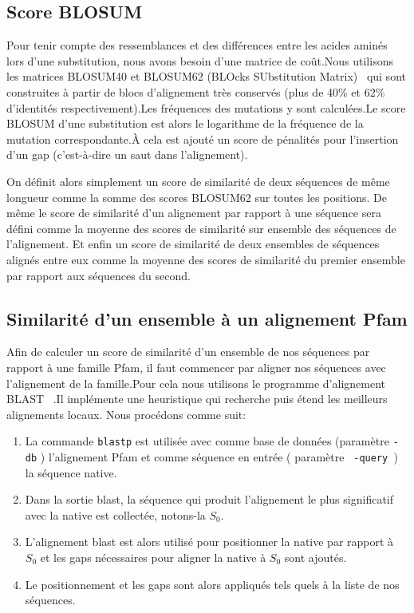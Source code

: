 \begin{enumerate}
\subsection{Score BLOSUM}

Pour tenir compte des ressemblances et des différences entre les acides aminés lors d'une substitution, nous avons besoin d'une matrice de coût.Nous utilisons les matrices BLOSUM40 et BLOSUM62 (BLOcks SUbstitution Matrix)~\citep{refBLOSUM} qui sont construites à partir de blocs d'alignement très conservés (plus de 40\% et 62\% d'identités respectivement).Les fréquences des mutations y sont calculées.Le score BLOSUM d'une substitution est alors le logarithme de la fréquence de la mutation correspondante.À cela est ajouté un score de pénalités pour l'insertion d'un gap (c'est-à-dire un saut dans l'alignement).

On définit alors simplement un score de similarité de deux séquences de même longueur comme la somme des scores BLOSUM62 sur toutes les positions. De même le score de similarité d'un alignement par rapport à une séquence sera défini comme la moyenne des scores de similarité sur ensemble des séquences de l'alignement. Et enfin un score de similarité de deux ensembles de séquences alignés entre eux comme la moyenne des scores de similarité du premier ensemble par rapport aux séquences du second.  

\subsection{Similarité d'un ensemble à un alignement Pfam}
\label{SimPfam}
Afin de calculer un score de similarité d'un ensemble de nos séquences par rapport à une famille Pfam, il faut commencer par aligner nos séquences avec l'alignement de la famille.Pour cela nous utilisons le programme d'alignement BLAST ~\citep{refBLAST}.Il implémente une heuristique qui recherche puis étend les meilleurs alignements locaux. Nous procédons comme suit:
\begin{enumerate}
\item La commande \verb!blastp! est utilisée avec comme base de données (paramètre \verb!-db! ) l'alignement Pfam et comme séquence en entrée ( paramètre \verb! -query !) la séquence native. 
\item Dans la sortie blast, la séquence qui produit l'alignement le plus significatif avec la native est collectée, notons-la $S_0$. 
\item L'alignement blast est alors utilisé pour positionner la native par rapport à $S_0$ et les gaps nécessaires pour aligner la native à $S_0$ sont ajoutés.
\item Le positionnement et les gaps sont alors appliqués tels quels à la liste de nos séquences.


\end{enumerate}
\end{enumerate}
